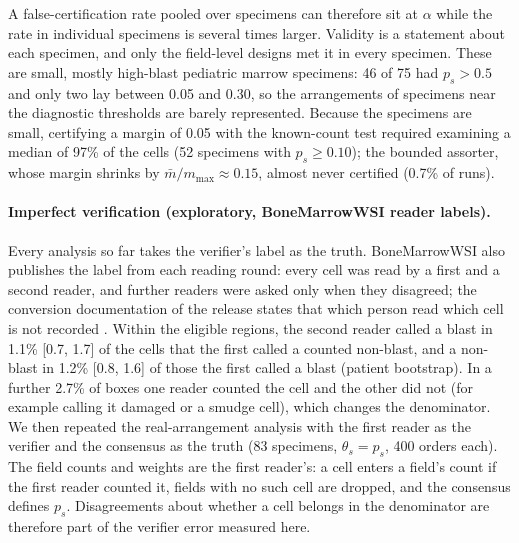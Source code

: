 \documentclass[11pt]{article}
\theoremstyle{remark}
\theoremstyle{definition}
\begin{document}
A false-certification rate pooled over specimens can therefore sit at $\alpha$ while the rate in individual specimens is several times larger. Validity is a statement about each specimen, and only the field-level designs met it in every specimen. These are small, mostly high-blast pediatric marrow specimens: 46 of 75 had $p_s>0.5$ and only two lay between 0.05 and 0.30, so the arrangements of specimens near the diagnostic thresholds are barely represented. Because the specimens are small, certifying a margin of 0.05 with the known-count test required examining a median of 97\% of the cells (52 specimens with $p_s\ge0.10$); the bounded assorter, whose margin shrinks by $\bar m/m_{\max}\approx0.15$, almost never certified (0.7\% of runs).

\paragraph{Imperfect verification (exploratory, BoneMarrowWSI reader labels).} Every analysis so far takes the verifier's label as the truth. BoneMarrowWSI also publishes the label from each reading round: every cell was read by a first and a second reader, and further readers were asked only when they disagreed; the conversion documentation of the release states that which person read which cell is not recorded \cite{hofener2025bmwsi}. Within the eligible regions, the second reader called a blast in 1.1\% [0.7, 1.7] of the cells that the first called a counted non-blast, and a non-blast in 1.2\% [0.8, 1.6] of those the first called a blast (patient bootstrap). In a further 2.7\% of boxes one reader counted the cell and the other did not (for example calling it damaged or a smudge cell), which changes the denominator. We then repeated the real-arrangement analysis with the first reader as the verifier and the consensus as the truth (83 specimens, $\theta_s=p_s$, 400 orders each). The field counts and weights are the first reader's: a cell enters a field's count if the first reader counted it, fields with no such cell are dropped, and the consensus defines $p_s$. Disagreements about whether a cell belongs in the denominator are therefore part of the verifier error measured here.
\end{document}
